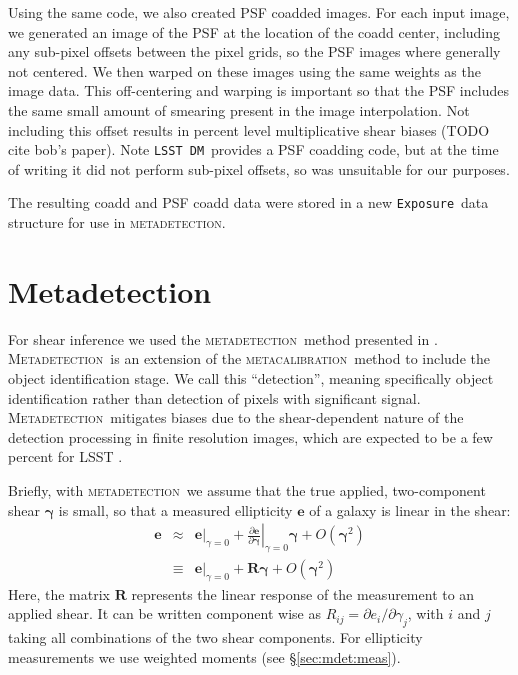 \documentclass[iop, twocolappendix, appendixfloats, numberedappendix, apj]{hackemulateapj}
\newcommand{\calexp}{\texttt{Exposure}}
\newcommand{\dm}{\texttt{LSST DM}}
\newcommand{\mcal}{\textsc{metacalibration}}
\newcommand{\mdet}{\textsc{metadetection}}
\newcommand{\Mdet}{\textsc{Metadetection}}
\begin{document}
Using the same code, we also created PSF coadded images.  For each input image,
we generated an image of the PSF at the location of the coadd center, including
any sub-pixel offsets between the pixel grids, so the PSF images where
generally not centered.  We then warped on these images using the same weights
as the image data.  This off-centering and warping is important so that the PSF
includes the same small amount of smearing present in the image interpolation.
Not including this offset results in percent level multiplicative shear biases
(TODO cite bob's paper).  Note \dm\ provides a PSF coadding code, but at the
time of writing it did not perform sub-pixel offsets, so was unsuitable for
our purposes.

The resulting coadd and PSF coadd data were stored in a new \calexp\ data
structure for use in \mdet.

\section{Metadetection} \label{sec:mdet}

For shear inference we used the \mdet\ method presented in \cite{mdet20}.
\Mdet\ is an extension of the \mcal\ method
\citep{HuffMcal2017,SheldonMcal2017} to include the object identification
stage. We call this ``detection'', meaning specifically object identification
rather than detection of pixels with significant signal.  \Mdet\ mitigates
biases due to the shear-dependent nature of the detection processing in finite
resolution images, which are expected to be a few percent for LSST
\citep{mdet20}.

Briefly, with \mdet\ we assume that the true applied, two-component shear
$\boldsymbol{\gamma}$ is small, so that a measured ellipticity $\boldsymbol{e}$
of a galaxy is linear in the shear:
\begin{eqnarray} \label{eq:response}
\boldsymbol{e} & \approx & \left.\boldsymbol{e}\right|_{\gamma=0} +
                           \left.\frac{\partial \boldsymbol{e}}{\partial\boldsymbol\gamma}\right|_{\gamma=0} \boldsymbol\gamma +
                           O(\boldsymbol\gamma^2)\nonumber\\
               & \equiv  & \left.\boldsymbol{e}\right|_{\gamma=0} +
                           \boldsymbol{R} \boldsymbol\gamma +
                           O(\boldsymbol\gamma^2)
\end{eqnarray}
Here, the matrix $\boldsymbol{R}$ represents the linear response of the
measurement to an applied shear. It can be written component wise as
$R_{ij}=\partial e_i /\partial \gamma_j$, with $i$ and
$j$ taking all combinations of the two shear components.  For ellipticity
measurements we use weighted moments (see \S \ref{sec:mdet:meas}).
\end{document}
